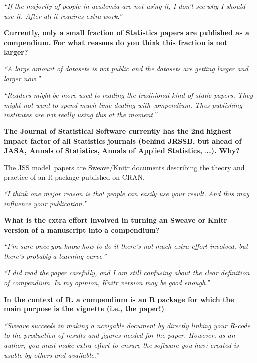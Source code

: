 \documentclass[portrait,11pt]{seminar}
\begin{document}
\es

\bs
\it ``If the majority of people in academia are not using it, I don’t see why I should use it. After all it requires extra work.''


\es

\bs
{\bf Currently, only a small fraction of Statistics papers are published as a compendium. For what reasons do you think this fraction is not larger?
}

\it ``A large amount of datasets is not public and the datasets are getting larger and larger now.''


\es
\bs
\it ``Readers might be more used to reading the traditional kind of static papers. They might not want to spend much time dealing with compendium. Thus publishing institutes are not really using this at the moment.''

\es

\bs
{\bf The Journal of Statistical Software currently has the 2nd highest impact factor of all Statistics journals (behind JRSSB, but ahead of JASA, Annals of Statistics, Annals of Applied Statistics, ...). Why?
}

\vspace{2cm}

The JSS model: papers are Sweave/Knitr documents describing the theory and practice of an R package published on CRAN.

\es

\bs
\it ``I think one major reason is that people can easily use your result. And this may influence your publication.''

\es

\bs
{\bf What is the extra effort involved in turning an Sweave or Knitr version of a manuscript into a compendium?
}

\it ``I'm sure once you know how to do it there’s not much extra effort involved, but there’s probably a learning curve.''


\it ``I did read the paper carefully, and I am still confusing about the clear definition of compendium. In my opinion, Knitr version may be good enough.''


{\bf In the context of R, a compendium is an R package for which the main purpose is the vignette (i.e., the paper!)}


\es

\bs
\it ``Sweave succeeds in making a navigable document by directly linking your R-code to the production of results and figures needed for the paper. However, as an author, you must make extra effort to ensure the software you have created is usable by others and available.''
\end{document}
